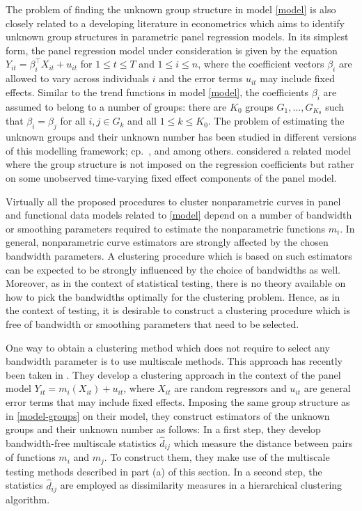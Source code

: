 The problem of finding the unknown group structure in model \eqref{model} is also closely related to a developing literature in econometrics which aims to identify unknown group structures in parametric panel regression models. In its simplest form, the panel regression model under consideration is given by the equation $Y_{it} = \beta_i^\top X_{it} + u_{it}$ for $1 \le t \le T$ and $1 \le i \le n$, where the coefficient vectors $\beta_i$ are allowed to vary across individuals $i$ and the error terms $u_{it}$ may include fixed effects. Similar to the trend functions in model \eqref{model}, the coefficients $\beta_i$ are assumed to belong to a number of groups: there are $K_0$ groups $G_1,\ldots,G_{K_0}$ such that $\beta_i = \beta_j$ for all $i,j \in G_k$ and all $1\le k \le K_0$. The problem of estimating the unknown groups and their unknown number has been studied in different versions of this modelling framework; cp.\ \cite{Su2016}, \cite{Su2018} and \cite{Wang2018} among others. \cite{Bonhomme2015} considered a related model where the group structure is not imposed on the regression coefficients but rather on some unobserved time-varying fixed effect components of the panel model. 


Virtually all the proposed procedures to cluster nonparametric curves in panel and functional data models related to \eqref{model} depend on a number of bandwidth or smoothing parameters required to estimate the nonparametric functions $m_i$. In general, nonparametric curve estimators are strongly affected by the chosen bandwidth parameters. A clustering procedure which is based on such estimators can be expected to be strongly influenced by the choice of bandwidths as well. Moreover, as in the context of statistical testing, there is no theory available on how to pick the bandwidths optimally for the clustering problem. Hence, as in the context of testing, it is desirable to construct a clustering procedure which is free of bandwidth or smoothing parameters that need to be selected. 


One way to obtain a clustering method which does not require to select any bandwidth parameter is to use multiscale methods. This approach has recently been taken in \cite{VogtLinton2018}. They develop a clustering approach in the context of the panel model $Y_{it} = m_i(X_{it}) + u_{it}$, where $X_{it}$ are random regressors and $u_{it}$ are general error terms that may include fixed effects. Imposing the same group structure as in \eqref{model-groups} on their  model, they construct estimators of the unknown groups and their unknown number as follows: In a first step, they develop bandwidth-free multiscale statistics $\hat{d}_{ij}$ which measure the distance between pairs of functions $m_i$ and $m_j$. To construct them, they make use of the multiscale testing methods described in part (a) of this section. In a second step, the statistics $\hat{d}_{ij}$ are employed as dissimilarity measures in a hierarchical clustering algorithm. 
